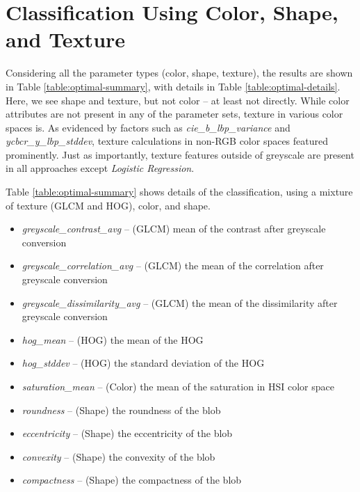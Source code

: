 \documentclass[letterpaper, notitlepage]{report}
\begin{document}
\section{Classification Using Color, Shape, and Texture}
Considering all the parameter types (color, shape, texture), the results are shown in Table \ref{table:optimal-summary}, with details in Table \ref{table:optimal-details}. Here, we see shape and texture, but not color -- at least not directly. While color attributes are not present in any of the parameter sets, texture in various color spaces is. As evidenced by factors such as \textit{cie\_b\_lbp\_variance} and \textit{ycbcr\_y\_lbp\_stddev}, texture calculations in non-RGB color spaces featured prominently. Just as importantly, texture features outside of greyscale are present in all approaches except \textit{Logistic Regression}.

{
\renewcommand{\arraystretch}{0.9}


}

Table \ref{table:optimal-summary} shows details of the classification, using a mixture of texture (GLCM and HOG), color, and shape.

\begin{itemize}
	\item{\textit{greyscale\_contrast\_avg} -- (GLCM) mean of the contrast after greyscale conversion}
	\item{\textit{greyscale\_correlation\_avg} -- (GLCM) the mean of the correlation after greyscale conversion}
	\item{\textit{greyscale\_dissimilarity\_avg} -- (GLCM) the mean of the dissimilarity after greyscale conversion}
	\item{\textit{hog\_mean} -- (HOG) the mean of the HOG}
	\item{\textit{hog\_stddev} -- (HOG) the standard deviation of the HOG}
	\item{\textit{saturation\_mean} -- (Color) the mean of the saturation in \gls{HSI} color space}
	\item{\textit{roundness} -- (Shape) the roundness of the blob}
	\item{\textit{eccentricity} -- (Shape) the eccentricity of the blob}
	\item{\textit{convexity} -- (Shape) the convexity of the blob}
	\item{\textit{compactness} -- (Shape) the compactness of the blob}
	
\end{itemize}
\end{document}
